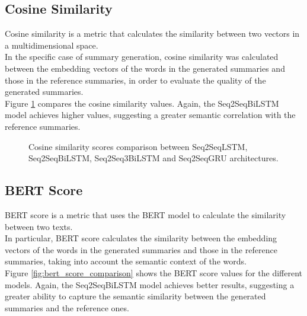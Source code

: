 


\subsection{Cosine Similarity}
Cosine similarity is a metric that calculates the similarity between two vectors in a multidimensional space.\\
In the specific case of summary generation, cosine similarity was calculated between the embedding vectors of the words in the generated summaries and those in the reference summaries, in order to evaluate the quality of the generated summaries.\\
Figure \ref{fig:cosine_similarity_comparison} compares the cosine similarity values. Again, the Seq2SeqBiLSTM model achieves higher values, suggesting a greater semantic correlation with the reference summaries.

\begin{figure}[H]
    \centering
    \hfill
    \hfill
    \hfill

    \caption{Cosine similarity scores comparison between Seq2SeqLSTM, Seq2SeqBiLSTM, Seq2Seq3BiLSTM and Seq2SeqGRU architectures.}
    \label{fig:cosine_similarity_comparison}
\end{figure}

\subsection{BERT Score}
BERT score is a metric that uses the BERT model to calculate the similarity between two texts.\\
In particular, BERT score calculates the similarity between the embedding vectors of the words in the generated summaries and those in the reference summaries, taking into account the semantic context of the words.\\
Figure \ref{fig:bert_score_comparison} shows the BERT score values for the different models. Again, the Seq2SeqBiLSTM model achieves better results, suggesting a greater ability to capture the semantic similarity between the generated summaries and the reference ones.

